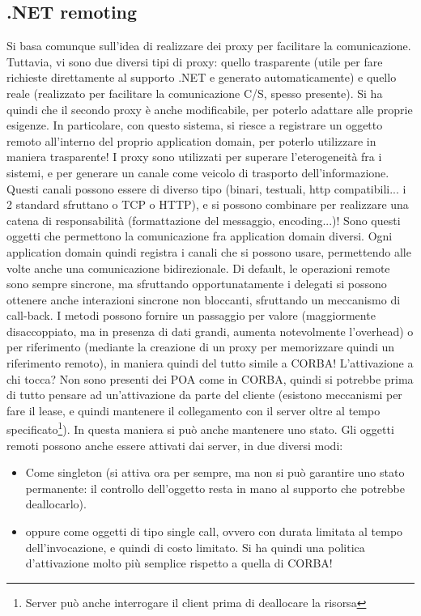 \subsection{.NET remoting}
Si basa comunque sull'idea di realizzare dei proxy per facilitare la comunicazione.
Tuttavia, vi sono due diversi tipi di proxy: quello trasparente (utile per fare richieste direttamente al supporto .NET
e generato automaticamente) e quello reale (realizzato per facilitare la comunicazione C/S, spesso presente). Si ha
quindi che il secondo proxy è anche modificabile, per poterlo adattare alle proprie esigenze. In particolare, con
questo sistema, si riesce a registrare un oggetto remoto all'interno del proprio application domain, per poterlo
utilizzare in maniera trasparente!
I proxy sono utilizzati per superare l'eterogeneità fra i sistemi, e per generare un canale come veicolo di trasporto
dell'informazione. Questi canali possono essere di diverso tipo (binari, testuali, http compatibili... i 2 standard
sfruttano o TCP o HTTP), e si possono combinare per realizzare una catena di responsabilità (formattazione del
messaggio, encoding...)! Sono questi oggetti che permettono la comunicazione fra application domain diversi. Ogni
application domain quindi registra i canali che si possono usare, permettendo alle volte anche una comunicazione
bidirezionale.
Di default, le operazioni remote sono sempre sincrone, ma sfruttando opportunatamente i delegati si possono ottenere
anche interazioni sincrone non bloccanti, sfruttando un meccanismo di call-back. I metodi possono fornire un
passaggio per valore (maggiormente disaccoppiato, ma in presenza di dati grandi, aumenta notevolmente l'overhead) o per
riferimento (mediante la creazione di un proxy per memorizzare quindi un riferimento remoto), in maniera quindi del
tutto simile a CORBA!
L'attivazione a chi tocca? Non sono presenti dei POA come in CORBA, quindi si potrebbe prima di tutto pensare ad
un'attivazione da parte del cliente (esistono meccanismi per fare il lease, e quindi mantenere il collegamento con il
server oltre al tempo specificato\footnote{Server può anche interrogare il client prima di deallocare la risorsa}). In
questa maniera si può anche mantenere uno stato.
Gli oggetti remoti possono anche essere attivati dai server, in due diversi modi:
\begin{itemize}
 \item Come singleton (si attiva ora per sempre, ma non si può garantire uno stato permanente: il controllo dell'oggetto
 resta in mano al supporto che potrebbe deallocarlo).
 \item oppure come oggetti di tipo single call, ovvero con durata limitata al tempo dell'invocazione, e quindi di costo
 limitato. Si ha quindi una politica d'attivazione molto più semplice rispetto a quella di CORBA!
\end{itemize}